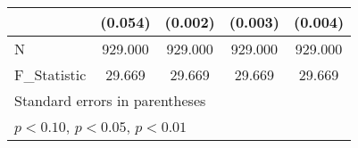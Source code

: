 {\begin{tabular}{l*{4}{c}}
            &     (0.054)         &     (0.002)         &     (0.003)         &     (0.004)         \\
\hline
N           &     929.000         &     929.000         &     929.000         &     929.000         \\
F\_Statistic &      29.669         &      29.669         &      29.669         &      29.669         \\
\hline\hline
\multicolumn{5}{l}{\footnotesize Standard errors in parentheses}\\
\multicolumn{5}{l}{\footnotesize \sym{*} \(p<0.10\), \sym{**} \(p<0.05\), \sym{***} \(p<0.01\)}\\
\end{tabular}
}
